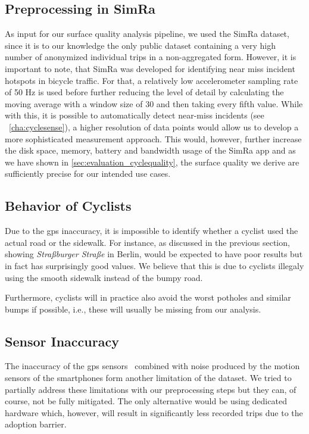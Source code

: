 \subsection{Preprocessing in SimRa}
\label{sec:problem_simra}
As input for our surface quality analysis pipeline, we used the SimRa dataset, since it is to our knowledge the only public dataset containing a very high number of anonymized individual trips in a non-aggregated form.
However, it is important to note, that SimRa was developed for identifying near miss incident hotspots in bicycle traffic.
For that, a relatively low accelerometer sampling rate of 50 Hz is used before further reducing the level of detail by calculating the moving average with a window size of 30 and then taking every fifth value.
While with this, it is possible to automatically detect near-miss incidents (see ~\cref{cha:cyclesense}), a higher resolution of data points would allow us to develop a more sophisticated measurement approach.
This would, however, further increase the disk space, memory, battery and bandwidth usage of the SimRa app and as we have shown in \cref{sec:evaluation_cyclequality}, the surface quality we derive are sufficiently precise for our intended use cases.

\subsection{Behavior of Cyclists}
\label{subsec:behavior_of_cyclists}
Due to the \ac{gps} inaccuracy, it is impossible to identify whether a cyclist used the actual road or the sidewalk.
For instance, as discussed in the previous section,  showing \textit{Straßburger Straße} in Berlin, would be expected to have poor results but in fact has surprisingly good values.
We believe that this is due to cyclists illegaly using the smooth sidewalk instead of the bumpy road.

Furthermore, cyclists will in practice also avoid the worst potholes and similar bumps if possible, i.e., these will usually be missing from our analysis.

\subsection{Sensor Inaccuracy}
\label{subsec:sensor_inaccuracy}
The inaccuracy of the \ac{gps} sensors~\cite{merry2019smartphone} combined with noise produced by the motion sensors of the smartphones form another limitation of the dataset.
We tried to partially address these limitations with our preprocessing steps but they can, of course, not be fully mitigated.
The only alternative would be using dedicated hardware which, however, will result in significantly less recorded trips due to the adoption barrier.

